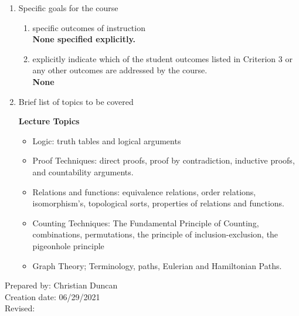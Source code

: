 \begin{enumerate}[1.]
\begin{enumerate}[a.]
\end{enumerate}

\item Specific goals for the course
\begin{enumerate}
\item specific outcomes of instruction\\ %
  {\bfseries
    None specified explicitly.
  }

\item explicitly indicate which of the student outcomes listed in Criterion 3 or any other outcomes are addressed by the course.\\
  {\bfseries
    None
  }
\end{enumerate}

\item Brief list of topics to be covered\\
  {\bfseries
    Lecture Topics
    \begin{itemize}
\item Logic: truth tables and logical arguments
\item Proof Techniques: direct proofs, proof by contradiction, inductive proofs, and countability arguments.
\item Relations and functions:  equivalence relations, order relations, isomorphism's, topological sorts, properties of relations and functions.
\item Counting Techniques:  The Fundamental Principle of Counting, combinations, permutations, the principle of inclusion-exclusion, the pigeonhole principle
\item Graph Theory; Terminology, paths, Eulerian and Hamiltonian Paths.
    \end{itemize}
  }

\end{enumerate}

\noindent Prepared by: Christian Duncan\\
\noindent Creation date: 06/29/2021\\
\noindent Revised:\\
